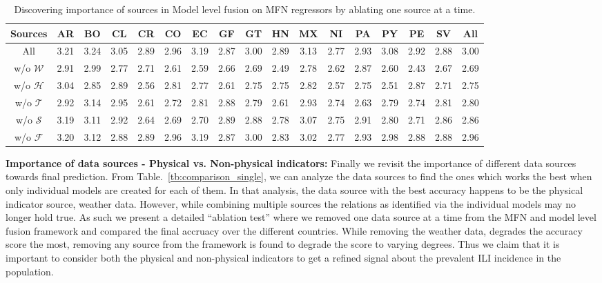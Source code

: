 \begin{table}[tb!]
  \centering
  \caption{\label{tb:Ablation} Discovering importance of sources in Model level fusion on MFN 
  regressors by ablating one source at a time.}
\vspace{1em}
\begin{tabular}{|*{17}{c|}}
\hline
Sources & AR & BO & CL & CR & CO & EC & GF & GT & HN & MX & NI & PA & PY & PE & SV & All\\
\hline 
\hline
All               & 3.21& 3.24& 3.05& 2.89& 2.96& 3.19& 2.87& 3.00& 2.89& 3.13& 2.77& 2.93& 3.08& 2.92& 2.88& 3.00\\
w/o $\mathcal{W}$ & 2.91& 2.99& 2.77& 2.71& 2.61& 2.59& 2.66& 2.69& 2.49& 2.78& 2.62& 2.87& 2.60& 2.43& 2.67& 2.69  \\
w/o $\mathcal{H}$ & 3.04& 2.85& 2.89& 2.56& 2.81& 2.77& 2.61& 2.75& 2.75& 2.82& 2.57& 2.75& 2.51& 2.87& 2.71& 2.75  \\
w/o $\mathcal{T}$ & 2.92& 3.14& 2.95& 2.61& 2.72& 2.81& 2.88& 2.79& 2.61& 2.93& 2.74& 2.63& 2.79& 2.74& 2.81& 2.80  \\
w/o $\mathcal{S}$ & 3.19& 3.11& 2.92& 2.64& 2.69& 2.70& 2.89& 2.88& 2.78& 3.07& 2.75& 2.91& 2.80& 2.71& 2.86& 2.86  \\
w/o $\mathcal{F}$ & 3.20& 3.12& 2.88& 2.89& 2.96& 3.19& 2.87& 3.00& 2.83& 3.02& 2.77& 2.93& 2.98& 2.88& 2.88& 2.96  \\
\hline
\end{tabular}
\end{table}

{\noindent \textbf{Importance of data sources - Physical vs. Non-physical indicators: }} Finally we revisit the importance of different data sources
towards final prediction. From Table.~\ref{tb:comparison_single}, we can analyze the data sources
to find the ones which works the best when only individual models are created for each of them. 
In that analysis, the data source with the best accuracy happens to be the physical indicator source, 
weather data. However, while combining multiple sources the relations as identified via the individual models
may no longer hold true. As such we present a detailed ``ablation test'' where we removed one data source at a time
from the MFN and model level fusion framework and compared the final accruacy over the different countries. 
While removing the weather data, degrades the accuracy score the most, removing any source from the framework is found
to degrade the score to varying degrees. Thus we claim that it is important to consider both the physical 
and non-physical indicators to get a refined signal about the prevalent ILI incidence in the population.


